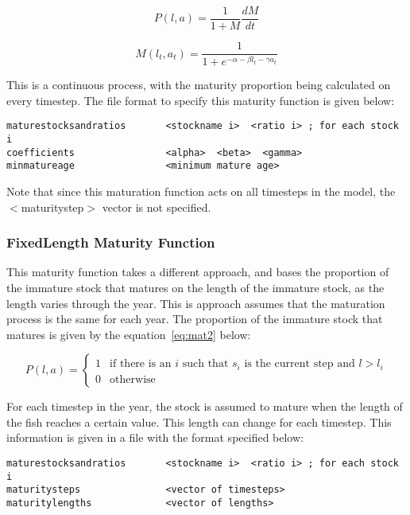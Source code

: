 \documentclass [a4paper, 10pt]{book}
\begin{document}
\begin{equation}\label{eq:mat1a}
P(l, a) = {\frac{1}{1 + M}}{\frac{dM}{dt}}
\end{equation}

\begin{equation}\label{eq:mat1b}
M(l_{t},a_{t}) = \frac{1}{1 + e^{-\alpha - \beta l_{t} - \gamma a_{t}}}
\end{equation}

This is a continuous process, with the maturity proportion being calculated on every timestep.  The file format to specify this maturity function is given below:

{\small\begin{verbatim}
maturestocksandratios       <stockname i>  <ratio i> ; for each stock i
coefficients                <alpha>  <beta>  <gamma>
minmatureage                <minimum mature age>
\end{verbatim}}

Note that since this maturation function acts on all timesteps in the model, the $<$maturitystep$>$ vector is not specified.

\subsubsection{FixedLength Maturity Function}
This maturity function takes a different approach, and bases the proportion of the immature stock that matures on the length of the immature stock, as the length varies through the year.  This is approach assumes that the maturation process is the same for each year.  The proportion of the immature stock that matures is given by the equation~\ref{eq:mat2} below:

\begin{equation}\label{eq:mat2}
P(l, a) =
\begin{cases}
1 & \textrm{if there is an $i$ such that $s_i$ is the current step and $l > l_i$}\\
0 & \textrm{otherwise}
\end{cases}
\end{equation}

For each timestep in the year, the stock is assumed to mature when the length of the fish reaches a certain value.  This length can change for each timestep.  This information is given in a file with the format specified below:

{\small\begin{verbatim}
maturestocksandratios       <stockname i>  <ratio i> ; for each stock i
maturitysteps               <vector of timesteps>
maturitylengths             <vector of lengths>
\end{verbatim}}
\end{document}
